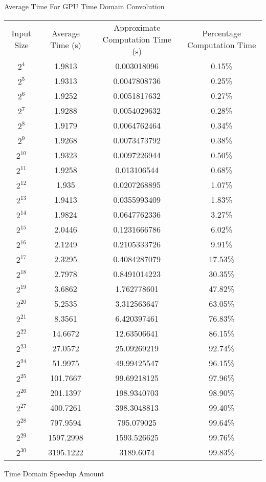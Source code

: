 \begin{center}
    Average Time For GPU Time Domain Convolution
    
    \begin{tabular}{c | c | c | c}
         Input Size & Average Time (s) &  Approximate Computation Time (s) & Percentage Computation Time \\
         $2^4$ & 1.9813 & 0.003018096 & 0.15\% \\
         $2^5$ & 1.9313 & 0.0047808736 & 0.25\% \\
         $2^6$ & 1.9252 & 0.0051817632 & 0.27\% \\
         $2^7$ & 1.9288 & 0.0054029632 & 0.28\% \\
         $2^8$ & 1.9179 & 0.0064762464 & 0.34\% \\
         $2^9$ & 1.9268 & 0.0073473792 & 0.38\% \\
         $2^{10}$ & 1.9323 & 0.0097226944 & 0.50\% \\
         $2^{11}$ & 1.9258 & 0.013106544 & 0.68\% \\
         $2^{12}$ & 1.935 & 0.0207268895 & 1.07\% \\
         $2^{13}$ & 1.9413 & 0.0355993409 & 1.83\% \\
         $2^{14}$ & 1.9824 & 0.0647762336 & 3.27\% \\
         $2^{15}$ & 2.0446 & 0.1231666786 & 6.02\% \\
         $2^{16}$ & 2.1249 & 0.2105333726 & 9.91\% \\
         $2^{17}$ & 2.3295 & 0.4084287079 & 17.53\% \\
         $2^{18}$ & 2.7978 & 0.8491014223 & 30.35\% \\
         $2^{19}$ & 3.6862 & 1.762778601 & 47.82\% \\
         $2^{20}$ & 5.2535 & 3.312563647 & 63.05\% \\
         $2^{21}$ & 8.3561 & 6.420397461 & 76.83\% \\
         $2^{22}$ & 14.6672 & 12.63506641 & 86.15\% \\
         $2^{23}$ & 27.0572 & 25.09269219 & 92.74\% \\
         $2^{24}$ & 51.9975 & 49.99425547 & 96.15\% \\
         $2^{25}$ & 101.7667 & 99.69218125 & 97.96\% \\
         $2^{26}$ & 201.1397 & 198.9340703 & 98.90\% \\
         $2^{27}$ & 400.7261 & 398.3048813 & 99.40\% \\
         $2^{28}$ & 797.9594 & 795.079025 & 99.64\% \\
         $2^{29}$ & 1597.2998 & 1593.526625 & 99.76\% \\
         $2^{30}$ & 3195.1222 & 3189.6074 & 99.83\% 
    \end{tabular}
    \newpage
    Time Domain Speedup Amount
    

\end{center}
